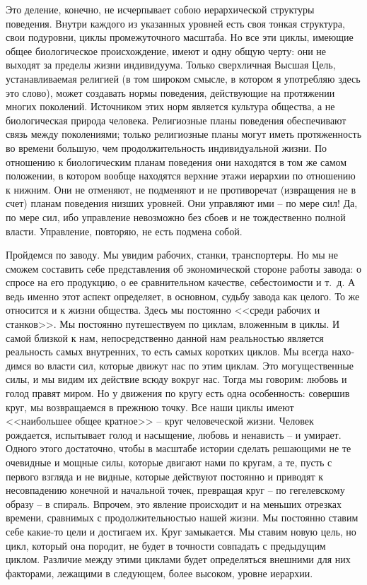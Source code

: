\documentclass{book}
\begin{document}
Это деление, конечно, не исчерпывает собою иерархической структуры поведения. Внутри каждого из указанных уровней есть своя тонкая структура, свои подуровни, циклы промежуточного масштаба. Но все эти циклы, имеющие общее биоло­гическое происхождение, имеют и одну общую черту: они не выходят за пределы жизни индивидуума. Только сверхличная Высшая Цель, устанавливаемая религией (в том широком смысле, в котором я употребляю здесь это слово), может со­здавать нормы поведения, действующие на протяжении многих поколений. Источником этих норм является культура общества, а не биологическая природа человека. Религиозные планы поведения обеспечивают связь между поколениями; только религиозные планы могут иметь протяженность во времени большую, чем продолжительность индивидуальной жизни. По отношению к биологическим планам поведения они находятся в том же самом положении, в котором вообще находятся верхние этажи иерархии по отношению к нижним. Они не отменяют, не подменяют и не противоречат (извращения не в счет) 
пла­нам поведения низших уровней. Они управляют ими -- по мере сил! Да, по мере сил, ибо управление невозможно без сбоев и не тождественно полной власти. Управление, повторяю, не есть подмена собой.

Пройдемся по заводу. Мы увидим рабочих, станки, транспор­теры. Но мы не сможем составить себе представления об экономической стороне работы завода: о спросе на его продукцию, о ее сравнительном качестве, себестоимости и т.~д. А ведь именно этот аспект определяет, в основном, судьбу завода как целого. То же относится и к жизни общества. Здесь мы постоянно <<среди рабочих и станков>>. Мы постоянно путешествуем по циклам, вложенным в циклы. И самой близкой к нам, непос­редственно данной нам реальностью является реальность самых внутренних, то есть самых коротких циклов. Мы всегда нахо­димся во власти сил, которые движут нас по этим циклам. Это могущественные силы, и мы видим их действие всюду вокруг нас. Тогда мы говорим: любовь и голод правят миром. Но у движения по кругу есть одна особенность: совершив круг, мы возвращаемся в прежнюю точку. Все наши циклы имеют <<наибольшее общее кратное>> -- круг человеческой жизни. Человек рождается, испытывает голод и насыщение, любовь и нена­висть -- и умирает. Одного 
этого 
достаточно, чтобы в масштабе истории сделать решающими не те очевидные и мощные силы, которые двигают нами по кругам, а те, пусть с первого взгляда и не видные, которые действуют постоянно и приводят к несовпадению конечной и начальной точек, превращая круг -- по гегелевскому образу -- в спираль. Впрочем, это явление происходит и на меньших отрезках времени, сравнимых с про­должительностью нашей жизни. Мы постоянно ставим себе ка­кие-то цели и достигаем их. Круг замыкается. Мы ставим новую цель, но цикл, который она породит, не будет в точности сов­падать с предыдущим циклом. Различие между этими циклами будет определяться внешними для них факторами, лежащими в следующем, более высоком, уровне иерархии.
\end{document}
